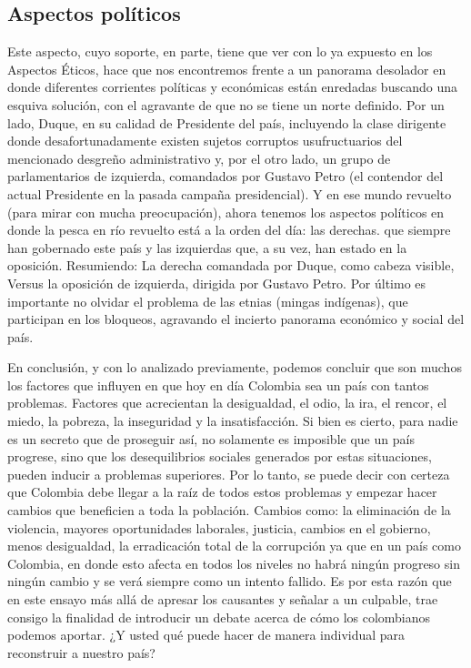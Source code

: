 \documentclass[doc, 12pt, letterpaper, donotrepeattitle, floatsintext, apacite]{apa6}    %
\begin{document}
\subsection{Aspectos políticos}
Este aspecto, cuyo soporte, en parte, tiene que ver con lo ya expuesto en los Aspectos Éticos, hace que nos encontremos frente a un panorama desolador en donde diferentes corrientes políticas y económicas están enredadas buscando una esquiva solución, con el agravante de que no se tiene un norte definido. Por un lado, Duque, en su calidad de Presidente del país, incluyendo la clase dirigente donde desafortunadamente existen sujetos corruptos usufructuarios del mencionado desgreño administrativo y, por el otro lado, un grupo de parlamentarios de izquierda, comandados por Gustavo Petro (el contendor del actual Presidente en la pasada campaña presidencial). Y en ese mundo revuelto (para mirar con mucha preocupación), ahora tenemos los aspectos políticos en donde la pesca en río revuelto está a la orden del día: las derechas. que siempre han gobernado este país y las izquierdas que, a su vez, han estado en la oposición. Resumiendo: La derecha comandada por Duque, como cabeza visible, Versus la oposición de izquierda, dirigida por Gustavo Petro. Por último es importante no olvidar el problema de las etnias (mingas indígenas), que participan en los bloqueos, agravando el incierto panorama económico y social del país.

En conclusión, y con lo analizado previamente, podemos concluir que son muchos los factores que influyen en que hoy en día Colombia sea un país con tantos problemas. Factores que acrecientan la desigualdad, el odio, la ira, el rencor, el miedo, la pobreza, la inseguridad y la insatisfacción. Si bien es cierto, para nadie es un secreto que de proseguir así, no solamente es imposible que un país progrese, sino que los desequilibrios sociales generados por estas situaciones, pueden inducir a problemas superiores. Por lo tanto, se puede decir con certeza que Colombia debe llegar a la raíz de todos estos problemas y empezar hacer cambios que beneficien a toda la población. Cambios como: la eliminación de la violencia, mayores oportunidades laborales, justicia, cambios en el gobierno, menos desigualdad, la erradicación total de la corrupción ya que en un país como Colombia, en donde esto afecta en todos los niveles no habrá ningún progreso sin ningún cambio y se verá siempre como un intento fallido. Es por esta razón que en este ensayo más allá de apresar los causantes y señalar a un culpable, trae consigo la finalidad de introducir un debate acerca de cómo los colombianos podemos aportar. ¿Y usted qué puede hacer de manera individual para reconstruir a nuestro país?


\newpage
\renewcommand\refname{\large\textbf{Referencias bibliográficas:}}

\end{document}

